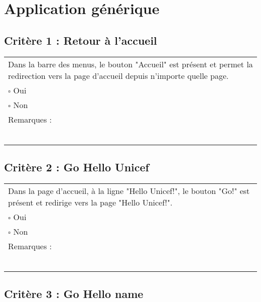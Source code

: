 
\section{Application générique}
	
	\subsection*{Critère 1 : Retour à l'accueil}
	
	\begin{center}
    	 		\begin{tabular}[h]{|p{}|}
			\hline
				Dans la barre des menus, le bouton "Accueil" est présent et permet la redirection vers la page d'accueil depuis n'importe quelle page. \\
				$\square$ Oui  \\ $\square$ Non \\\hline Remarques : \\ ~\\
			 \\\hline
     		\end{tabular}
  		\end{center}	
  		
  		
	\subsection*{Critère 2 : Go Hello Unicef}
	
	\begin{center}
    	 		\begin{tabular}[h]{|p{}|}
			\hline
				Dans la page d'accueil, à la ligne "Hello Unicef!", le bouton "Go!" est présent et redirige vers la page "Hello Unicef!". \\
				$\square$ Oui  \\ $\square$ Non \\\hline Remarques : \\ ~\\
			 \\\hline
     		\end{tabular}
  		\end{center}	
  		
  	\subsection*{Critère 3 : Go Hello name}
	
